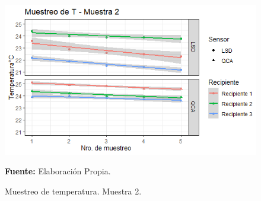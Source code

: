     \begin{figure}[H]
        \centering
        \includegraphics[width=0.75\linewidth]{Imagenes/cap4/T_M2.png}
        \caption {Muestreo de temperatura. Muestra 2. }{\textbf{Fuente:}
        Elaboraci\'on Propia. }
        \label{fig:M2T}
    \end{figure}

